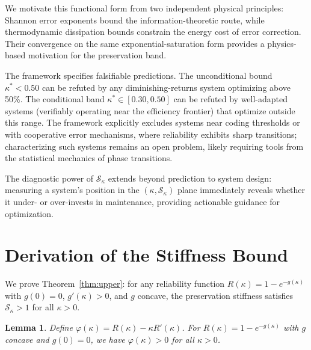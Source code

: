 \documentclass[11pt,twocolumn]{article}
\newtheorem{lemma}{Lemma}
\begin{document}
We motivate this functional form from two independent physical principles: Shannon error exponents bound the information-theoretic route, while thermodynamic dissipation bounds constrain the energy cost of error correction. Their convergence on the same exponential-saturation form provides a physics-based motivation for the preservation band.

The framework specifies falsifiable predictions. The unconditional bound $\kappa^* < 0.50$ can be refuted by any diminishing-returns system optimizing above 50\%. The conditional band $\kappa^* \in [0.30, 0.50]$ can be refuted by well-adapted systems (verifiably operating near the efficiency frontier) that optimize outside this range. The framework explicitly excludes systems near coding thresholds or with cooperative error mechanisms, where reliability exhibits sharp transitions; characterizing such systems remains an open problem, likely requiring tools from the statistical mechanics of phase transitions.

The diagnostic power of $\mathcal{S}_\kappa$ extends beyond prediction to system design: measuring a system's position in the $(\kappa, \mathcal{S}_\kappa)$ plane immediately reveals whether it under- or over-invests in maintenance, providing actionable guidance for optimization.

\appendix

\section{Derivation of the Stiffness Bound}
\label{app:stiffness}

We prove Theorem~\ref{thm:upper}: for any reliability function $R(\kappa) = 1 - e^{-g(\kappa)}$ with $g(0) = 0$, $g'(\kappa) > 0$, and $g$ concave, the preservation stiffness satisfies $\mathcal{S}_\kappa > 1$ for all $\kappa > 0$.

\begin{lemma}
\label{lemma:phi}
Define $\varphi(\kappa) = R(\kappa) - \kappa R'(\kappa)$. For $R(\kappa) = 1 - e^{-g(\kappa)}$ with $g$ concave and $g(0) = 0$, we have $\varphi(\kappa) > 0$ for all $\kappa > 0$.
\end{lemma}
\end{document}

